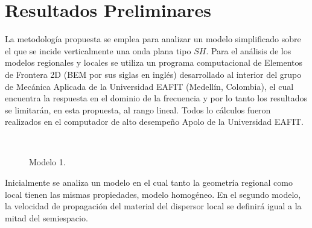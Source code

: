 \documentclass[spanish,letterpaper,12pt,twoside,openany]{article}
\begin{document}
\section{Resultados Preliminares}
%
La metodología propuesta se emplea para analizar un modelo simplificado sobre el que se incide verticalmente una onda plana tipo $SH$. Para el análisis de los modelos regionales y locales se utiliza un programa computacional de Elementos de Frontera 2D (BEM por sus siglas en inglés) desarrollado al interior del grupo de Mecánica Aplicada de la Universidad EAFIT (Medellín, Colombia), el cual encuentra la respuesta en el dominio de la frecuencia y por lo tanto los resultados se limitarán, en esta propuesta, al rango lineal. Todos lo cálculos fueron realizados en el computador de alto desempeño Apolo de la Universidad EAFIT.
%
\begin{figure}[H]
	\centering
	\\
	\vspace{-.5 cm}
    \caption{Modelo 1.}
    \label{fig:model1}
    \vspace{-.5 cm}
\end{figure}
%
Inicialmente se analiza un modelo en el cual tanto la geometría regional como local tienen las mismas propiedades, modelo homogéneo. En el segundo modelo, la velocidad de propagación del material del dispersor local se definirá igual a la mitad del semiespacio.
\end{document}
